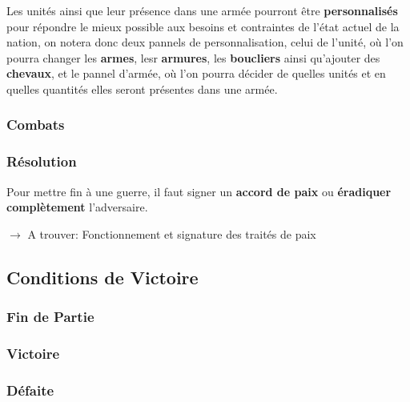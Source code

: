 \documentclass{article}
\newcommand*{\mybox}[2]{\colorbox{#1!30}{\parbox{.98\linewidth}{#2}}}
\newcommand\tab[1][0.5cm]{\hspace*{#1}}
\begin{document}
                Les unités ainsi que leur présence dans une armée pourront être \textbf{personnalisés} pour répondre le mieux possible aux besoins et contraintes de l'état actuel de la nation, on notera donc deux pannels de personnalisation, celui de l'unité, où l'on pourra changer les \textbf{armes}, lesr \textbf{armures}, les \textbf{boucliers} ainsi qu'ajouter des \textbf{chevaux}, et le pannel d'armée, où l'on pourra décider de quelles unités et en quelles quantités elles seront présentes dans une armée.

            \subsubsection{Combats}
                    
            \subsubsection{Résolution}
                Pour mettre fin à une guerre, il faut signer un \textbf{accord de paix} ou \textbf{éradiquer complètement} l'adversaire. \\
                
                \tab \mybox{lightgray}{$\rightarrow$ A trouver: Fonctionnement et signature des traités de paix} 

    \subsection{Conditions de Victoire}  
        \subsubsection{Fin de Partie}
        \subsubsection{Victoire}
        \subsubsection{Défaite}
\pagebreak
\end{document}
